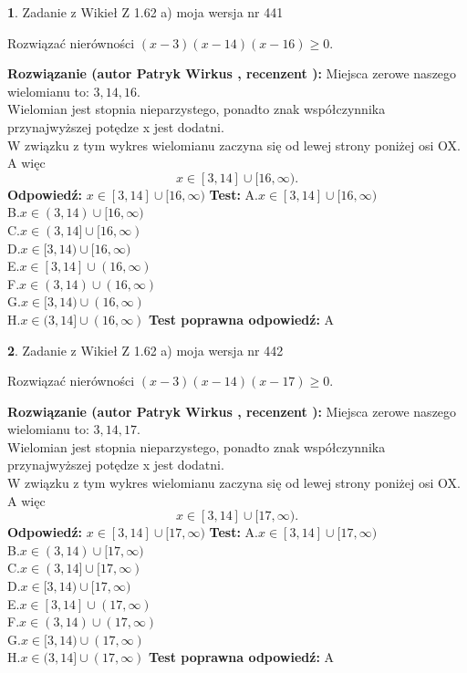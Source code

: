 \documentclass[12pt, a4paper]{article}
\theoremstyle{definition} %
\newtheorem{zad}{}
\newcommand{\zadStart}[1]{\begin{zad}#1\newline}
\newcommand{\zadStop}{\end{zad}}
\newcommand{\rozwStart}[2]{\noindent \textbf{Rozwiązanie (autor #1 , recenzent #2): }\newline}
\newcommand{\rozwStop}{\newline}
\newcommand{\odpStart}{\noindent \textbf{Odpowiedź:}\newline}
\newcommand{\odpStop}{\newline}
\newcommand{\testStart}{\noindent \textbf{Test:}\newline}
\newcommand{\testStop}{\newline}
\newcommand{\kluczStart}{\noindent \textbf{Test poprawna odpowiedź:}\newline}
\newcommand{\kluczStop}{\newline}
\begin{document}
\zadStart{Zadanie z Wikieł Z 1.62 a) moja wersja nr 441}

Rozwiązać nierówności $(x-3)(x-14)(x-16)\ge0$.
\zadStop
\rozwStart{Patryk Wirkus}{}
Miejsca zerowe naszego wielomianu to: $3, 14, 16$.\\
Wielomian jest stopnia nieparzystego, ponadto znak współczynnika przy\linebreak najwyższej potędze x jest dodatni.\\ W związku z tym wykres wielomianu zaczyna się od lewej strony poniżej osi OX. A więc $$x \in [3,14] \cup [16,\infty).$$
\rozwStop
\odpStart
$x \in [3,14] \cup [16,\infty)$
\odpStop
\testStart
A.$x \in [3,14] \cup [16,\infty)$\\
B.$x \in (3,14) \cup [16,\infty)$\\
C.$x \in (3,14] \cup [16,\infty)$\\
D.$x \in [3,14) \cup [16,\infty)$\\
E.$x \in [3,14] \cup (16,\infty)$\\
F.$x \in (3,14) \cup (16,\infty)$\\
G.$x \in [3,14) \cup (16,\infty)$\\
H.$x \in (3,14] \cup (16,\infty)$
\testStop
\kluczStart
A
\kluczStop



\zadStart{Zadanie z Wikieł Z 1.62 a) moja wersja nr 442}

Rozwiązać nierówności $(x-3)(x-14)(x-17)\ge0$.
\zadStop
\rozwStart{Patryk Wirkus}{}
Miejsca zerowe naszego wielomianu to: $3, 14, 17$.\\
Wielomian jest stopnia nieparzystego, ponadto znak współczynnika przy\linebreak najwyższej potędze x jest dodatni.\\ W związku z tym wykres wielomianu zaczyna się od lewej strony poniżej osi OX. A więc $$x \in [3,14] \cup [17,\infty).$$
\rozwStop
\odpStart
$x \in [3,14] \cup [17,\infty)$
\odpStop
\testStart
A.$x \in [3,14] \cup [17,\infty)$\\
B.$x \in (3,14) \cup [17,\infty)$\\
C.$x \in (3,14] \cup [17,\infty)$\\
D.$x \in [3,14) \cup [17,\infty)$\\
E.$x \in [3,14] \cup (17,\infty)$\\
F.$x \in (3,14) \cup (17,\infty)$\\
G.$x \in [3,14) \cup (17,\infty)$\\
H.$x \in (3,14] \cup (17,\infty)$
\testStop
\kluczStart
A
\kluczStop
\end{document}
